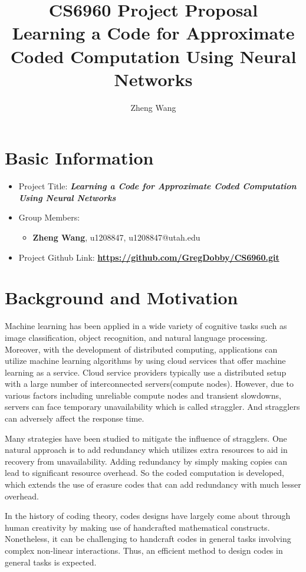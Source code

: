 \documentclass{article}
\title{CS6960 Project Proposal \protect\\ Learning a Code for Approximate Coded Computation Using Neural Networks}
\author{Zheng Wang}
\newcommand {\weblink}[1]{\href{#1}{\textbf{#1}}}
\begin{document}
        \maketitle

        \section{Basic Information}
        \begin{itemize} 
           \item Project Title: \textbf{\textit{Learning a Code for Approximate Coded Computation Using Neural Networks}}
           \item Group Members:
           \begin{itemize}
               \item \textbf{Zheng Wang}, u1208847, u1208847@utah.edu
           \end{itemize}
           \item Project Github Link: \weblink{https://github.com/GregDobby/CS6960.git}
        \end{itemize}   

        \section{Background and Motivation}
        Machine learning has been applied in a wide variety of cognitive tasks such as image classification, object recognition, and natural language processing. Moreover, with the development of distributed computing, applications can utilize machine learning algorithms by using cloud services that offer machine learning as a service. Cloud service providers typically use a distributed setup with a large number of interconnected servers(compute nodes). However, due to various factors including unreliable compute nodes and transient slowdowns, servers can face temporary unavailability which is called straggler. And stragglers can adversely affect the response time.
    
    Many strategies have been studied to mitigate the influence of stragglers. One natural approach is to add redundancy which utilizes extra resources to aid in recovery from unavailability. Adding redundancy by simply making copies can lead to significant resource overhead. So the coded computation is developed, which extends the use of erasure codes that can add redundancy with much lesser overhead. 
    
    In the history of coding theory, codes designs have largely come about through human creativity by making use of handcrafted mathematical constructs. Nonetheless, it can be challenging to handcraft codes in general tasks involving complex non-linear interactions. Thus, an efficient method to design codes in general tasks is expected.
            
\end{document}
